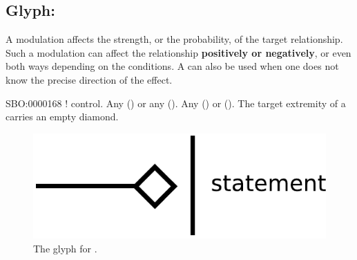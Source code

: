 \color{blue}
\subsection{Glyph: }\label{sec:modulation}

A modulation affects the strength, or the probability, of the target relationship. Such a modulation can affect the
relationship \textbf{positively or negatively}, or even both ways depending on the conditions. A  can also be used when one does not know the precise direction of the effect.

\begin{glyphDescription}
 \glyphSboTerm SBO:0000168 ! control.
 \glyphOrigin Any  () or any  ().
 \glyphTarget Any  () or  ().
 \glyphEndPoint The target extremity of a  carries an empty diamond.
 \end{glyphDescription}

\begin{figure}[H]
  \centering
  \includegraphics[scale = 0.5]{images/modulation}
  \caption{The \ER glyph for .}
  \label{fig:modulation}
\end{figure}
 
% 



